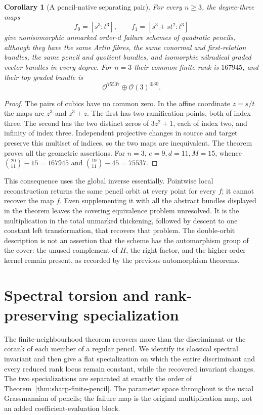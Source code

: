 \documentclass[11pt,reqno]{amsart}
\numberwithin{equation}{section}
\newtheorem{corollary}[theorem]{Corollary}
\theoremstyle{definition}\newtheorem{definition}[theorem]{Definition}
\theoremstyle{remark}\newtheorem{remark}[theorem]{Remark}
\newcommand{\OO}{\mathcal O}\newcommand{\II}{\mathcal I}
\begin{document}
\begin{corollary}[A pencil-native separating pair]
\label{cor:pencil-native-pair-v148}
For every \(n\ge3\), the degree-three maps
\[
          f_0=[s^3:t^3],\qquad f_1=[s^3+st^2:t^3]
\]
give nonisomorphic unmarked order-\(d\) failure schemes of
quadratic pencils, although they have the same Artin fibres, the
same conormal and first-relation bundles, the same pencil and
quotient bundles, and isomorphic nilradical graded vector bundles
in every degree.  For \(n=3\) their common finite rank is
\(167945\), and their top graded bundle is
\[
                  \OO^{75537}\oplus\OO(3)^{\oplus30}.
\]
\end{corollary}
\begin{proof}
The pairs of cubics have no common zero.  In the affine coordinate
\(z=s/t\) the maps are \(z^3\) and \(z^3+z\).
The first has two ramification points, both of index three.
The second has the two distinct zeros of \(3z^2+1\), each of
index two, and infinity of index three.  Independent projective
changes in source and target preserve this multiset of indices,
so the two maps are inequivalent.  The theorem proves all the
geometric assertions.  For \(n=3\),
\(e=9,d=11,M=15\), whence
\(\binom{20}{11}-15=167945\) and
\(\binom{19}{11}-45=75537\).
\end{proof}

This consequence uses the global inverse essentially.  Pointwise
local reconstruction returns the same pencil orbit at every
point for every \(f\); it cannot recover the map \(f\).
Even supplementing it with all the abstract bundles displayed in
the theorem leaves the covering equivalence problem unresolved.
It is the multiplication in the total unmarked thickening,
followed by descent to one constant left transformation, that
recovers that problem.  The double-orbit description is not an
assertion that the scheme has the automorphism group of the
cover: the unused complement of \(H\), the right factor, and
the higher-order kernel remain present, as recorded by the
previous automorphism theorems.

\section{Spectral torsion and rank-preserving specialization}
\label{sec:spectral-specialization}

The finite-neighbourhood theorem recovers more than the discriminant
or the corank of each member of a regular pencil.  We identify its
classical spectral invariant and then give a flat specialization on
which the entire discriminant and every reduced rank locus remain
constant, while the recovered invariant changes.  The two specializations
are separated at exactly the order of Theorem~\ref{thm:sharp-finite-pencil}.
The parameter space throughout is the usual Grassmannian of pencils;
the failure map is the original multiplication map, not an added
coefficient-evaluation block.
\end{document}
